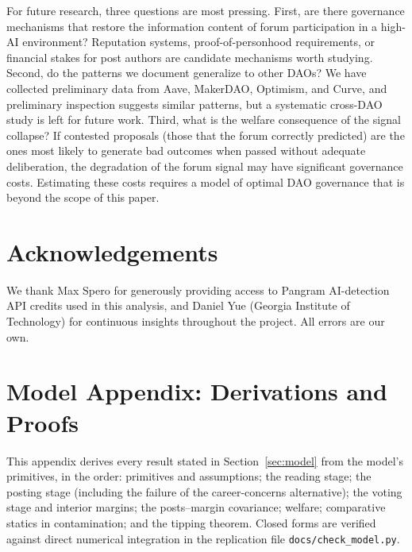 \documentclass[12pt]{article}
\begin{document}
For future research, three questions are most pressing. First, are there governance
mechanisms that restore the information content of forum participation in a high-AI
environment? Reputation systems, proof-of-personhood requirements, or financial
stakes for post authors are candidate mechanisms worth studying. Second, do the
patterns we document generalize to other DAOs? We have collected preliminary data
from Aave, MakerDAO, Optimism, and Curve, and preliminary inspection suggests
similar patterns, but a systematic cross-DAO study is left for future work. Third,
what is the welfare consequence of the signal collapse? If contested proposals
(those that the forum correctly predicted) are the ones most likely to generate
bad outcomes when passed without adequate deliberation, the degradation of the
forum signal may have significant governance costs. Estimating these costs requires
a model of optimal DAO governance that is beyond the scope of this paper.



\clearpage
\section*{Acknowledgements}

We thank Max Spero for generously providing access to Pangram AI-detection API credits used in this analysis, and Daniel Yue (Georgia Institute of Technology) for continuous insights throughout the project. All errors are our own.




\clearpage
\appendix

\section{Model Appendix: Derivations and Proofs}
\label{app:theory}

This appendix derives every result stated in Section~\ref{sec:model} from the model's primitives, in the order: primitives and assumptions; the reading stage; the posting stage (including the failure of the career-concerns alternative); the voting stage and interior margins; the posts--margin covariance; welfare; comparative statics in contamination; and the tipping theorem. Closed forms are verified against direct numerical integration in the replication file \texttt{docs/check\_model.py}.
\end{document}

